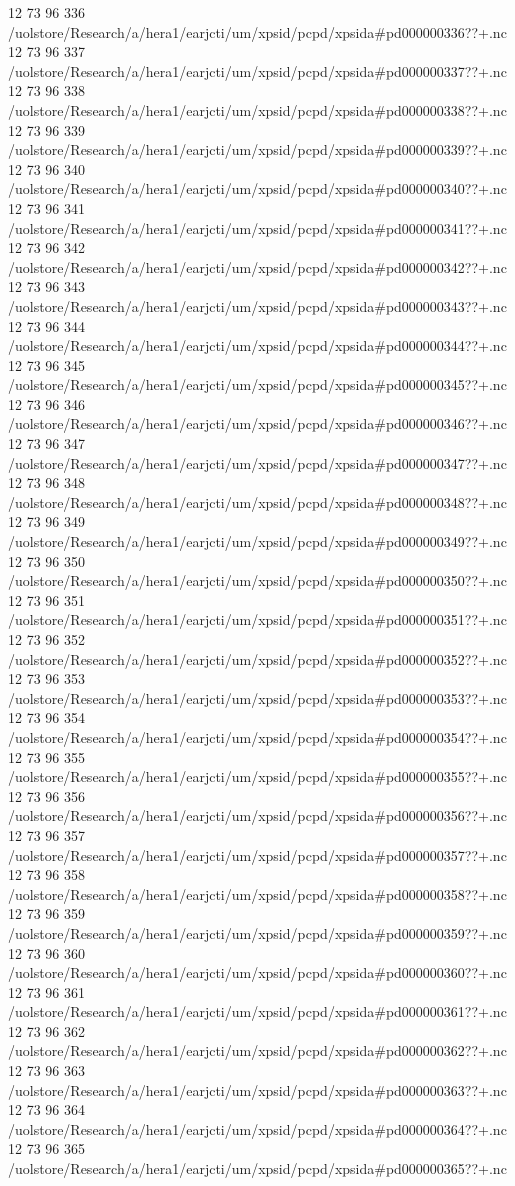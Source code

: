 12 73 96
336
/uolstore/Research/a/hera1/earjcti/um/xpsid/pcpd/xpsida#pd000000336??+.nc
12 73 96
337
/uolstore/Research/a/hera1/earjcti/um/xpsid/pcpd/xpsida#pd000000337??+.nc
12 73 96
338
/uolstore/Research/a/hera1/earjcti/um/xpsid/pcpd/xpsida#pd000000338??+.nc
12 73 96
339
/uolstore/Research/a/hera1/earjcti/um/xpsid/pcpd/xpsida#pd000000339??+.nc
12 73 96
340
/uolstore/Research/a/hera1/earjcti/um/xpsid/pcpd/xpsida#pd000000340??+.nc
12 73 96
341
/uolstore/Research/a/hera1/earjcti/um/xpsid/pcpd/xpsida#pd000000341??+.nc
12 73 96
342
/uolstore/Research/a/hera1/earjcti/um/xpsid/pcpd/xpsida#pd000000342??+.nc
12 73 96
343
/uolstore/Research/a/hera1/earjcti/um/xpsid/pcpd/xpsida#pd000000343??+.nc
12 73 96
344
/uolstore/Research/a/hera1/earjcti/um/xpsid/pcpd/xpsida#pd000000344??+.nc
12 73 96
345
/uolstore/Research/a/hera1/earjcti/um/xpsid/pcpd/xpsida#pd000000345??+.nc
12 73 96
346
/uolstore/Research/a/hera1/earjcti/um/xpsid/pcpd/xpsida#pd000000346??+.nc
12 73 96
347
/uolstore/Research/a/hera1/earjcti/um/xpsid/pcpd/xpsida#pd000000347??+.nc
12 73 96
348
/uolstore/Research/a/hera1/earjcti/um/xpsid/pcpd/xpsida#pd000000348??+.nc
12 73 96
349
/uolstore/Research/a/hera1/earjcti/um/xpsid/pcpd/xpsida#pd000000349??+.nc
12 73 96
350
/uolstore/Research/a/hera1/earjcti/um/xpsid/pcpd/xpsida#pd000000350??+.nc
12 73 96
351
/uolstore/Research/a/hera1/earjcti/um/xpsid/pcpd/xpsida#pd000000351??+.nc
12 73 96
352
/uolstore/Research/a/hera1/earjcti/um/xpsid/pcpd/xpsida#pd000000352??+.nc
12 73 96
353
/uolstore/Research/a/hera1/earjcti/um/xpsid/pcpd/xpsida#pd000000353??+.nc
12 73 96
354
/uolstore/Research/a/hera1/earjcti/um/xpsid/pcpd/xpsida#pd000000354??+.nc
12 73 96
355
/uolstore/Research/a/hera1/earjcti/um/xpsid/pcpd/xpsida#pd000000355??+.nc
12 73 96
356
/uolstore/Research/a/hera1/earjcti/um/xpsid/pcpd/xpsida#pd000000356??+.nc
12 73 96
357
/uolstore/Research/a/hera1/earjcti/um/xpsid/pcpd/xpsida#pd000000357??+.nc
12 73 96
358
/uolstore/Research/a/hera1/earjcti/um/xpsid/pcpd/xpsida#pd000000358??+.nc
12 73 96
359
/uolstore/Research/a/hera1/earjcti/um/xpsid/pcpd/xpsida#pd000000359??+.nc
12 73 96
360
/uolstore/Research/a/hera1/earjcti/um/xpsid/pcpd/xpsida#pd000000360??+.nc
12 73 96
361
/uolstore/Research/a/hera1/earjcti/um/xpsid/pcpd/xpsida#pd000000361??+.nc
12 73 96
362
/uolstore/Research/a/hera1/earjcti/um/xpsid/pcpd/xpsida#pd000000362??+.nc
12 73 96
363
/uolstore/Research/a/hera1/earjcti/um/xpsid/pcpd/xpsida#pd000000363??+.nc
12 73 96
364
/uolstore/Research/a/hera1/earjcti/um/xpsid/pcpd/xpsida#pd000000364??+.nc
12 73 96
365
/uolstore/Research/a/hera1/earjcti/um/xpsid/pcpd/xpsida#pd000000365??+.nc
